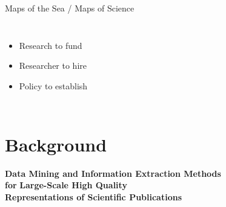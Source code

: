 \documentclass[en,16:9,smallfoot]{sdqbeamer}
\begin{document}
\begin{frame}[t]{Maps of the Sea / Maps of Science}
\begin{overprint}
\begin{columns}
               \begin{itemize}
                   \item Research to fund
                   \item Researcher to hire
                   \item Policy to establish
               \end{itemize}
       \end{columns}
   \end{overprint}
    \vspace{1cm}
    \centering
   \end{frame}

\section{Background}

   \begin{frame}[plain]
        \vspace{1cm}
        \centering
        \begin{Large}
        {\color{lightgrey}\textbf{Data Mining and Information Extraction Methods}}\\
        \vspace{0.25em}
        {\color{lightgrey}\textbf{for}}\textbf{ Large-Scale High Quality}\\
        \vspace{0.5em}
        {\color{lightgrey}\textbf{Representations of Scientific Publications}}
        \end{Large}
   \end{frame}
\end{document}
